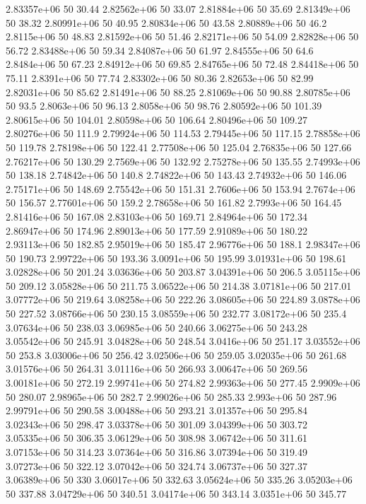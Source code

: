 2.83357e+06 50 30.44
2.82562e+06 50 33.07
2.81884e+06 50 35.69
2.81349e+06 50 38.32
2.80991e+06 50 40.95
2.80834e+06 50 43.58
2.80889e+06 50 46.2
2.8115e+06 50 48.83
2.81592e+06 50 51.46
2.82171e+06 50 54.09
2.82828e+06 50 56.72
2.83488e+06 50 59.34
2.84087e+06 50 61.97
2.84555e+06 50 64.6
2.8484e+06 50 67.23
2.84912e+06 50 69.85
2.84765e+06 50 72.48
2.84418e+06 50 75.11
2.8391e+06 50 77.74
2.83302e+06 50 80.36
2.82653e+06 50 82.99
2.82031e+06 50 85.62
2.81491e+06 50 88.25
2.81069e+06 50 90.88
2.80785e+06 50 93.5
2.8063e+06 50 96.13
2.8058e+06 50 98.76
2.80592e+06 50 101.39
2.80615e+06 50 104.01
2.80598e+06 50 106.64
2.80496e+06 50 109.27
2.80276e+06 50 111.9
2.79924e+06 50 114.53
2.79445e+06 50 117.15
2.78858e+06 50 119.78
2.78198e+06 50 122.41
2.77508e+06 50 125.04
2.76835e+06 50 127.66
2.76217e+06 50 130.29
2.7569e+06 50 132.92
2.75278e+06 50 135.55
2.74993e+06 50 138.18
2.74842e+06 50 140.8
2.74822e+06 50 143.43
2.74932e+06 50 146.06
2.75171e+06 50 148.69
2.75542e+06 50 151.31
2.7606e+06 50 153.94
2.7674e+06 50 156.57
2.77601e+06 50 159.2
2.78658e+06 50 161.82
2.7993e+06 50 164.45
2.81416e+06 50 167.08
2.83103e+06 50 169.71
2.84964e+06 50 172.34
2.86947e+06 50 174.96
2.89013e+06 50 177.59
2.91089e+06 50 180.22
2.93113e+06 50 182.85
2.95019e+06 50 185.47
2.96776e+06 50 188.1
2.98347e+06 50 190.73
2.99722e+06 50 193.36
3.0091e+06 50 195.99
3.01931e+06 50 198.61
3.02828e+06 50 201.24
3.03636e+06 50 203.87
3.04391e+06 50 206.5
3.05115e+06 50 209.12
3.05828e+06 50 211.75
3.06522e+06 50 214.38
3.07181e+06 50 217.01
3.07772e+06 50 219.64
3.08258e+06 50 222.26
3.08605e+06 50 224.89
3.0878e+06 50 227.52
3.08766e+06 50 230.15
3.08559e+06 50 232.77
3.08172e+06 50 235.4
3.07634e+06 50 238.03
3.06985e+06 50 240.66
3.06275e+06 50 243.28
3.05542e+06 50 245.91
3.04828e+06 50 248.54
3.0416e+06 50 251.17
3.03552e+06 50 253.8
3.03006e+06 50 256.42
3.02506e+06 50 259.05
3.02035e+06 50 261.68
3.01576e+06 50 264.31
3.01116e+06 50 266.93
3.00647e+06 50 269.56
3.00181e+06 50 272.19
2.99741e+06 50 274.82
2.99363e+06 50 277.45
2.9909e+06 50 280.07
2.98965e+06 50 282.7
2.99026e+06 50 285.33
2.993e+06 50 287.96
2.99791e+06 50 290.58
3.00488e+06 50 293.21
3.01357e+06 50 295.84
3.02343e+06 50 298.47
3.03378e+06 50 301.09
3.04399e+06 50 303.72
3.05335e+06 50 306.35
3.06129e+06 50 308.98
3.06742e+06 50 311.61
3.07153e+06 50 314.23
3.07364e+06 50 316.86
3.07394e+06 50 319.49
3.07273e+06 50 322.12
3.07042e+06 50 324.74
3.06737e+06 50 327.37
3.06389e+06 50 330
3.06017e+06 50 332.63
3.05624e+06 50 335.26
3.05203e+06 50 337.88
3.04729e+06 50 340.51
3.04174e+06 50 343.14
3.0351e+06 50 345.77
